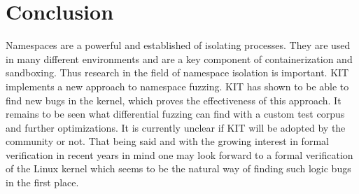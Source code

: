 \documentclass[10pt,twocolumn,a4paper]{article}
\begin{document}
\section{Conclusion}
Namespaces are a powerful and established of isolating processes. 
They are used in many different environments and are a key component of containerization and sandboxing.
Thus research in the field of namespace isolation is important.
KIT implements a new approach to namespace fuzzing.
KIT has shown to be able to find new bugs in the kernel, which proves the effectiveness of this approach. 
It remains to be seen what differential fuzzing can find with a custom test corpus and further optimizations.
It is currently unclear if KIT will be adopted by the community or not.
That being said and with the growing interest in formal verification in recent years in mind one may look forward to a formal verification of the Linux kernel which seems to be the natural way of finding such logic bugs in the first place.


\end{document}
